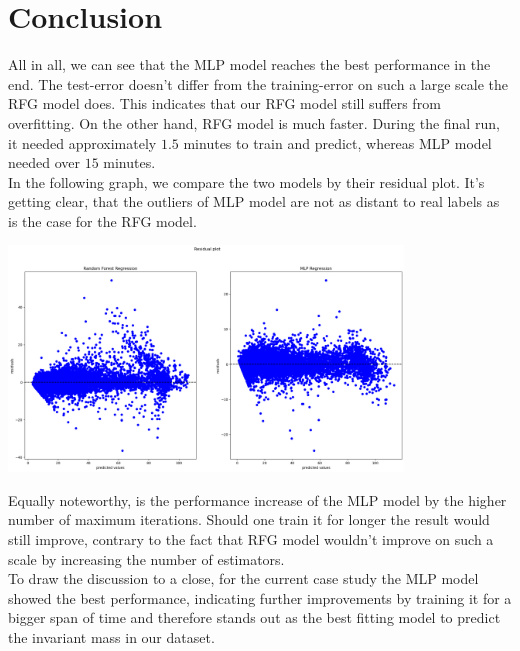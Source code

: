 \documentclass[12pt]{article}
\begin{document}
\section{Conclusion }
All in all, we can see that the MLP model reaches the best performance in the end. The test-error doesn't differ from the training-error on such a large scale the RFG model does. This indicates that our RFG model still suffers from overfitting. On the other hand, RFG model is much faster. During the final run, it needed approximately $1.5$ minutes to train and predict, whereas MLP model needed over $15$ minutes.\\
In the following graph, we compare the two models by their residual plot. It's getting clear, that the outliers of MLP model are not as distant to real labels as is the case for the RFG model.
\begin{center}
  \includegraphics[height=6cm]{Residual_Plot.png}
\end{center}
Equally noteworthy, is the performance increase of the MLP model by the higher number of maximum iterations. Should one train it for longer the result would still improve, contrary to the fact that RFG model wouldn't improve on such a scale by increasing the number of estimators.\\

To draw the discussion to a close, for the current case study the MLP model showed the best performance, indicating further improvements by training it for a bigger span of time and therefore stands out as the best fitting model to predict the invariant mass in our dataset.

\newpage

\nocite{cern-electron-collision-data}

\end{document}
